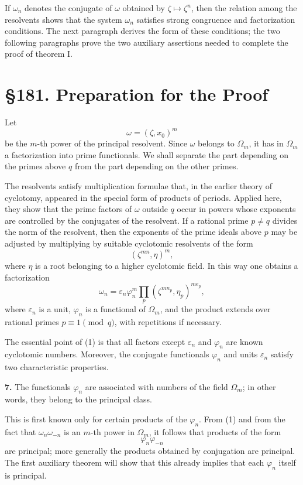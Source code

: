 \documentclass[12pt,a4paper]{article}
\newcommand{\webersection}[2]{\clearpage\section*{\S #1. #2}}
\newcommand{\Om}{\Omega_m}
\newcommand{\zetaS}{\zeta}
\begin{document}
If \(\omega_n\) denotes the conjugate of \(\omega\) obtained by \(\zetaS\mapsto\zetaS^n\), then the relation among the resolvents shows that the system \(\omega_n\) satisfies strong congruence and factorization conditions.  The next paragraph derives the form of these conditions; the two following paragraphs prove the two auxiliary assertions needed to complete the proof of theorem I.

\webersection{181}{Preparation for the Proof}

Let
\[
  \omega=(\zetaS,x_0)^m
\]
be the \(m\)-th power of the principal resolvent.  Since \(\omega\) belongs to \(\Om\), it has in \(\Om\) a factorization into prime functionals.  We shall separate the part depending on the primes above \(q\) from the part depending on the other primes.

The resolvents satisfy multiplication formulae that, in the earlier theory of cyclotomy, appeared in the special form of products of periods.  Applied here, they show that the prime factors of \(\omega\) outside \(q\) occur in powers whose exponents are controlled by the conjugates of the resolvent.  If a rational prime \(p\ne q\) divides the norm of the resolvent, then the exponents of the prime ideals above \(p\) may be adjusted by multiplying by suitable cyclotomic resolvents of the form
\[
  (\zetaS^{mn},\eta)^m,
\]
where \(\eta\) is a root belonging to a higher cyclotomic field.  In this way one obtains a factorization
\[
  \omega_n=\varepsilon_n\varphi_n^m
       \prod_p (\zetaS^{m n_p},\eta_p)^{m e_p},
\tag{1}
\]
where \(\varepsilon_n\) is a unit, \(\varphi_n\) is a functional of \(\Om\), and the product extends over rational primes \(p\equiv1\pmod q\), with repetitions if necessary.

The essential point of (1) is that all factors except \(\varepsilon_n\) and \(\varphi_n\) are known cyclotomic numbers.  Moreover, the conjugate functionals \(\varphi_n\) and units \(\varepsilon_n\) satisfy two characteristic properties.

\textbf{7.} The functionals \(\varphi_n\) are associated with numbers of the field \(\Om\); in other words, they belong to the principal class.

This is first known only for certain products of the \(\varphi_n\).  From (1) and from the fact that \(\omega_n\omega_{-n}\) is an \(m\)-th power in \(\Om\), it follows that products of the form
\[
  \varphi_n\varphi_{-n}
\]
are principal; more generally the products obtained by conjugation are principal.  The first auxiliary theorem will show that this already implies that each \(\varphi_n\) itself is principal.
\end{document}
